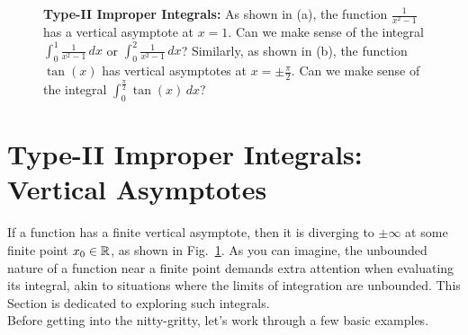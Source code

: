 \vspace*{1cm} 
\begin{figure}[ht]%
\centering
{}
\hfill%
\hfill
    \caption[]{\textbf{Type-II Improper Integrals:} As shown in (a), the function $\frac{1}{x^2-1}$ has a vertical asymptote at $x=1$. Can we make sense of the integral $\int_0^1 \frac{1}{x^2-1} \, dx$ or  $\int_{0}^2 \frac{1}{x^2-1} \, dx$? Similarly, as shown in (b), the function $\tan(x)$ has vertical asymptotes at $x=\pm \frac{\pi}{2}$. Can we make sense of the integral $\int_0^{\frac{\pi}{2}} \tan(x) \, dx$? }
    \label{fig:TypeIIimproperIntegralVerticalAsymptotes}
\end{figure}


\section{Type-II Improper Integrals: Vertical Asymptotes}

If a function has a finite vertical asymptote, then it is diverging to $\pm \infty$ at some finite point $x_0\in \mathbb R$, as shown in Fig.~\ref{fig:TypeIIimproperIntegralVerticalAsymptotes}. As you can imagine, the unbounded nature of a function near a finite point demands extra attention when evaluating its integral, akin to situations where the limits of integration are unbounded. This Section is dedicated to exploring such integrals. \\

Before getting into the nitty-gritty, let's work through a few basic examples.\\

